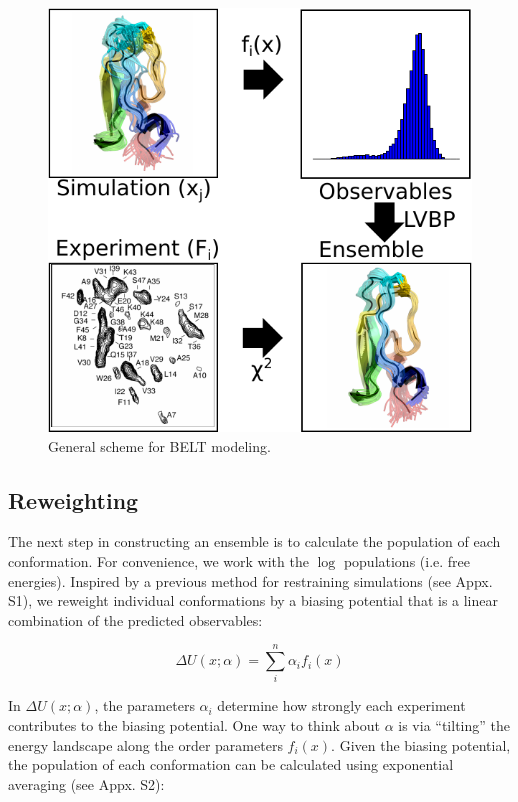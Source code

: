 \documentclass[journal=jacsat,manuscript=article]{achemso}
\begin{document}
\begin{figure}

\includegraphics[width=18.0cm]{figures/info_graphic/info_graphic.pdf}

\caption{
General scheme for BELT modeling.
}
\label{figure:BELT}
\end{figure}

\subsection{Reweighting}

The next step in constructing an ensemble is to calculate the population of each conformation.  For convenience, we work with the $\log$ populations (i.e. free energies). Inspired by a previous method for restraining simulations \cite{chodera2012} (see Appx. S1), we reweight individual conformations by a biasing potential that is a linear combination of the predicted observables:

$$\Delta U(x;\alpha) = \sum_i^n \alpha_i f_i(x)$$

In $\Delta U(x;\alpha)$, the parameters $\alpha_i$ determine how strongly each experiment contributes to the biasing potential.  One way to think about $\alpha$ is via ``tilting'' the energy landscape along the order parameters $f_i(x)$.  Given the biasing potential, the population of each conformation can be calculated using exponential averaging (see Appx. S2):
\end{document}
